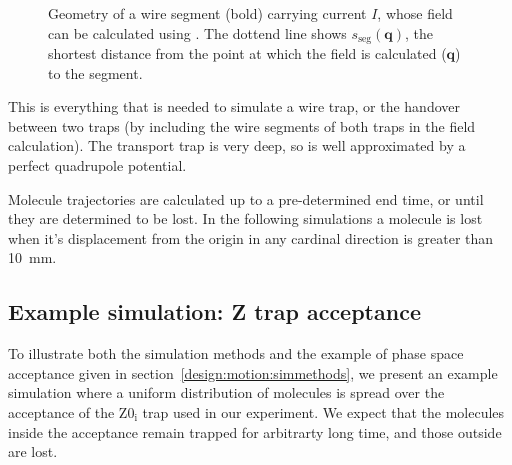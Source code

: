 \begin{figure}[h]
\centering
  \caption{Geometry of a wire segment (bold) carrying current $I$, whose field
  can be calculated using . The dottend line
  shows $s_\text{seg}(\mathbf{q})$, the shortest distance from the point at
  which the field is calculated ($\mathbf{q}$) to the segment.
  }
  \label{design:fig:wiresegment}
\end{figure}

This is everything that is needed to simulate a wire trap, or the handover
between two traps (by including the wire segments of both traps in the field
calculation). The transport trap is very deep, so is well approximated by a
perfect quadrupole potential.

Molecule trajectories are calculated up to a pre-determined end time, or until
they are determined to be lost. In the following simulations a molecule is lost
when it's displacement from the origin in any cardinal direction is greater
than \SI{10}{\milli\meter}.

\subsection{Example simulation: Z trap acceptance}

To illustrate both the simulation methods and the example of phase space
acceptance given in section~\ref{design:motion:simmethods}, we present an
example simulation where a uniform distribution of molecules is spread over the
acceptance of the $\mathrm{Z0_i}$ trap used in our experiment. We expect that
the molecules inside the acceptance remain trapped for arbitrarty long time,
and those outside are lost.

